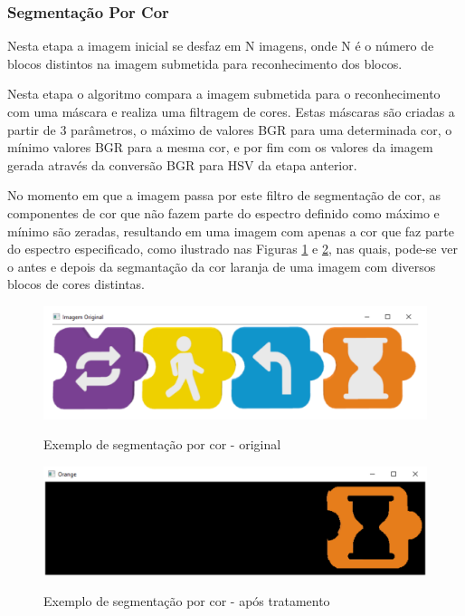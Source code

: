     
    \subsubsection{Segmentação Por Cor}
    Nesta etapa a imagem inicial se desfaz em N imagens, onde N  é o número de blocos distintos na imagem submetida para reconhecimento dos blocos.
    
    Nesta etapa o algoritmo compara a imagem submetida para o reconhecimento com uma máscara e realiza uma filtragem de cores. Estas máscaras são criadas a partir de 3 parâmetros, o máximo de valores BGR para uma determinada cor, o mínimo valores BGR para a mesma cor, e por fim com os valores da imagem gerada através da conversão BGR para HSV da etapa anterior. 
    
    No momento em que a imagem passa por este filtro de segmentação de cor, as componentes de cor que não fazem parte do espectro definido como máximo e mínimo são zeradas, resultando em uma imagem com apenas a cor que faz parte do espectro especificado, como ilustrado nas Figuras \ref{figura:ex1_original} e \ref{figura:ex1_tratado}, nas quais, pode-se ver o antes e depois da segmantação da cor laranja de uma imagem com diversos blocos de cores distintas.
    
    \begin{figure}[H]
        \caption{Exemplo de segmentação por cor - original}
        \centering
        \includegraphics[width=\linewidth]{Imagens/Cap4/ex1_original.PNG}
        \label{figura:ex1_original}
    \end{figure}
    
    
    \begin{figure}[H]
        \caption{Exemplo de segmentação por cor - após tratamento}
        \centering
        \includegraphics[width=\linewidth]{Imagens/Cap4/ex1_tratado.PNG}
        \label{figura:ex1_tratado}
    \end{figure}
    
